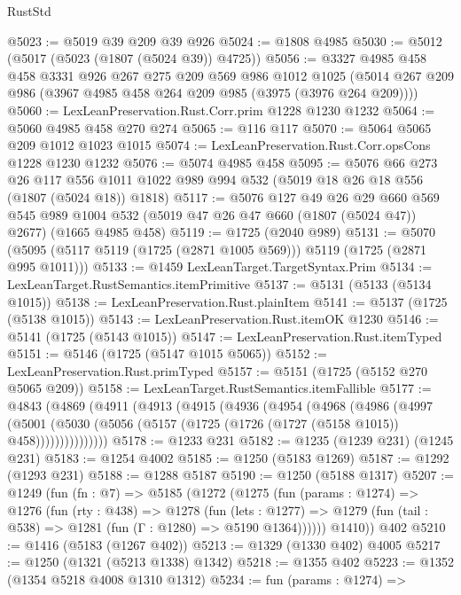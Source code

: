 \begin{lexlean}{RustStd}
\begin{coremodule}
{\begin{coremodule}
{{{{{{{{{{{{{@5023 := @5019 @39 @209 @39 @926
@5024 := @1808 @4985
@5030 := @5012 (@5017 (@5023 (@1807 (@5024 @39)) @4725))
@5056 := @3327
    @4985
    @458
    @458
    @3331
    @926
    @267
    @275
    @209
    @569
    @986
    @1012
    @1025
    (@5014 @267 @209 @986 (@3967 @4985 @458 @264 @209 @985 (@3975 (@3976 @264 @209))))
@5060 := LexLeanPreservation.Rust.Corr.prim @1228 @1230 @1232
@5064 := @5060 @4985 @458 @270 @274
@5065 := @116 @117
@5070 := @5064 @5065 @209 @1012 @1023 @1015
@5074 := LexLeanPreservation.Rust.Corr.opsCons @1228 @1230 @1232
@5076 := @5074 @4985 @458
@5095 := @5076
    @66
    @273
    @26
    @117
    @556
    @1011
    @1022
    @989
    @994
    @532
    (@5019 @18 @26 @18 @556 (@1807 (@5024 @18)) @1818)
@5117 := @5076
    @127
    @49
    @26
    @29
    @660
    @569
    @545
    @989
    @1004
    @532
    (@5019 @47 @26 @47 @660 (@1807 (@5024 @47)) @2677)
    (@1665 @4985 @458)
@5119 := @1725 (@2040 @989)
@5131 := @5070 (@5095 (@5117 @5119 (@1725 (@2871 @1005 @569))) @5119 (@1725 (@2871 @995 @1011)))
@5133 := @1459 LexLeanTarget.TargetSyntax.Prim
@5134 := LexLeanTarget.RustSemantics.itemPrimitive
@5137 := @5131 (@5133 (@5134 @1015))
@5138 := LexLeanPreservation.Rust.plainItem
@5141 := @5137 (@1725 (@5138 @1015))
@5143 := LexLeanPreservation.Rust.itemOK @1230
@5146 := @5141 (@1725 (@5143 @1015))
@5147 := LexLeanPreservation.Rust.itemTyped
@5151 := @5146 (@1725 (@5147 @1015 @5065))
@5152 := LexLeanPreservation.Rust.primTyped
@5157 := @5151 (@1725 (@5152 @270 @5065 @209))
@5158 := LexLeanTarget.RustSemantics.itemFallible
@5177 := @4843
    (@4869
      (@4911
        (@4913
          (@4915
            (@4936
              (@4954
                (@4968
                  (@4986
                    (@4997
                      (@5001
                        (@5030 (@5056 (@5157 (@1725 (@1726 (@1727 (@5158 @1015)) @458)))))))))))))))
@5178 := @1233 @231
@5182 := @1235 (@1239 @231) (@1245 @231)
@5183 := @1254 @4002
@5185 := @1250 (@5183 @1269)
@5187 := @1292 (@1293 @231)
@5188 := @1288 @5187
@5190 := @1250 (@5188 @1317)
@5207 := @1249
    (fun (fn : @7) =>
    @5185
      (@1272
        (@1275
          (fun (params : @1274) =>
          @1276
            (fun (rty : @438) =>
            @1278
              (fun (lets : @1277) =>
              @1279 (fun (tail : @538) => @1281 (fun (Γ : @1280) => @5190 @1364))))))
        @1410))
    @402
@5210 := @1416 (@5183 (@1267 @402))
@5213 := @1329 (@1330 @402) @4005
@5217 := @1250 (@1321 (@5213 @1338) @1342)
@5218 := @1355 @402
@5223 := @1352 (@1354 @5218 @4008 @1310 @1312)
@5234 := fun (params : @1274) =>
}}}}}}}}}}}}}
\end{coremodule}}
\end{coremodule}
\end{lexlean}
